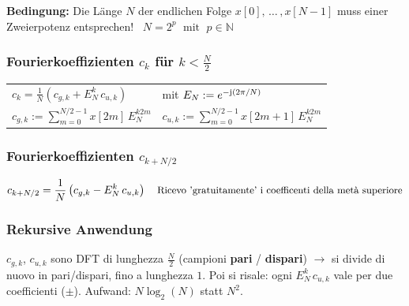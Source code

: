 \textbf{Bedingung:} Die Länge $N$ der endlichen Folge $x[0], \, \ldots \, , x[N-1]$ muss einer Zweierpotenz entsprechen! 
\textrightarrow\ $N = 2^p \; \text{ mit } \; p \in \mathbb{N}$


\subsubsection{Fourierkoeffizienten $c_k$ für $k < \frac{N}{2}$}

\vspace{-0.2cm}

\renewcommand{\arraystretch}{2.5}
\begin{tabular}{ll}
    $\boxed{c_k = \frac{1}{N} \left( c_{g,k} + E_N^k \, c_{u,k} \right)}$   & mit $E_N := e^{-\mathrm{j}(2 \pi/N)}$  \\
    $c_{g,k}:= \sum \limits_{m = 0}^{N/2-1} x[2m] \,  E_N^{k2m}$    & $c_{u,k}:= \sum \limits_{m = 0}^{N/2-1} x[2m+1] \,  E_N^{k2m}$
\end{tabular}
\renewcommand{\arraystretch}{1}

\subsubsection{Fourierkoeffizienten $c_{k + N/2}$ }\vspace{-1em}

$$c_{k + N/2} =  \frac{1}{N} \left( c_{g,k} - E_N^k \, c_{u,k} \right)
\quad
\text{\small Ricevo 'gratuitamente' i coefficenti della metà superiore}
$$

\subsubsection*{Rekursive Anwendung}

$c_{g,k}$, $c_{u,k}$ sono DFT di lunghezza $\frac{N}{2}$ (campioni \textbf{pari} / \textbf{dispari}) $\to$ 
si divide di nuovo in pari/dispari, fino a lunghezza $1$. Poi si risale: ogni $E_N^k\,c_{u,k}$ vale per due 
coefficienti ($\pm$). Aufwand: $N\log_2 (N)$ statt $N^2$.